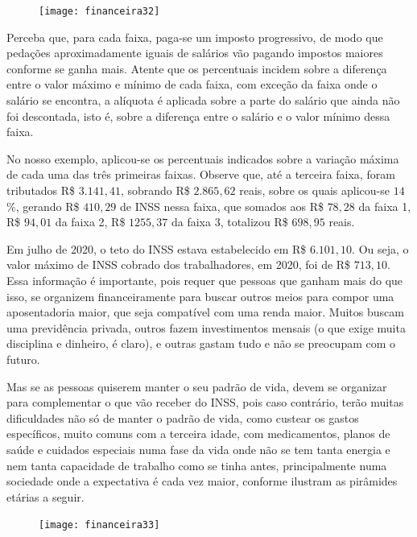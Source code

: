 \begin{figure}[H]
\centering

\texttt{[image: financeira32]}
\end{figure}

Perceba que, para cada faixa, paga-se um imposto progressivo, de modo que pedações aproximadamente iguais de salários vão pagando impostos maiores conforme se ganha mais. Atente que os percentuais incidem sobre a diferença entre o valor máximo e mínimo de cada faixa, com exceção da faixa onde o salário se encontra, a alíquota é aplicada sobre a parte do salário que ainda não foi descontada, isto é, sobre a diferença entre o salário e o valor mínimo dessa faixa.

No nosso exemplo, aplicou-se os percentuais indicados sobre a variação máxima de cada uma das três primeiras faixas. Observe que, até a terceira faixa, foram tributados R\$ $3.141{,}41$, sobrando R\$ $2.865{,}62$ reais, sobre os quais aplicou-se $14$\%, gerando R\$ $410{,}29$ de INSS nessa faixa, que somados aos R\$ $78{,}28$ da faixa 1, R\$ $94{,}01$ da faixa 2, R\$ $1255{,}37$ da faixa 3, totalizou R\$ $698{,}95$ reais.

Em julho de 2020, o teto do INSS estava estabelecido em R\$ $6.101{,}10$. Ou seja, o valor máximo de INSS cobrado dos trabalhadores, em 2020, foi de R\$ $713{,}10$. Essa informação é importante, pois requer que pessoas que ganham mais do que isso, se organizem financeiramente para buscar outros meios para compor uma aposentadoria maior, que seja compatível com uma renda maior. Muitos buscam uma previdência privada, outros fazem investimentos mensais (o que exige muita disciplina e dinheiro, é claro), e outras gastam tudo e não se preocupam com o futuro.

Mas se as pessoas quiserem manter o seu padrão de vida, devem se organizar para complementar o que vão receber do INSS, pois caso contrário, terão muitas dificuldades não só de manter o padrão de vida, como custear os gastos específicos, muito comuns com a terceira idade, com medicamentos, planos de saúde e cuidados especiais numa fase da vida onde não se tem tanta energia e nem tanta capacidade de trabalho como se tinha antes, principalmente numa sociedade onde a expectativa é cada vez maior, conforme ilustram as pirâmides etárias a seguir.

\begin{figure}[H]
\centering

\texttt{[image: financeira33]}
\end{figure}

